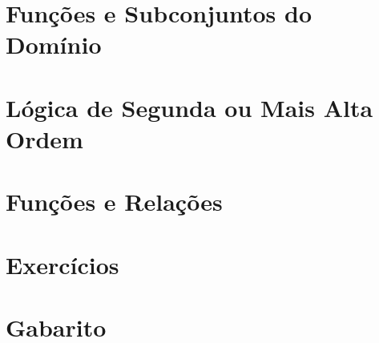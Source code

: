

\section{Funções e Subconjuntos do Domínio}



\section{Lógica de Segunda ou Mais Alta Ordem}



\section{Funções e Relações}



\section{Exercícios}



\section{Gabarito}

